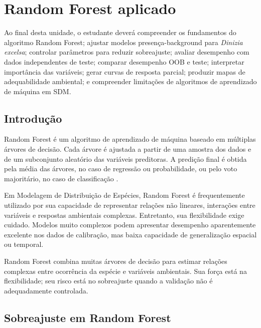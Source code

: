\chapter[Random Forest]{Random Forest aplicado}

\begin{objetivos}
	Ao final desta unidade, o estudante deverá compreender os fundamentos do algoritmo Random Forest; ajustar modelos presença-background para \textit{Dinizia excelsa}; controlar parâmetros para reduzir sobreajuste; avaliar desempenho com dados independentes de teste; comparar desempenho OOB e teste; interpretar importância das variáveis; gerar curvas de resposta parcial; produzir mapas de adequabilidade ambiental; e compreender limitações de algoritmos de aprendizado de máquina em SDM.
\end{objetivos}

\section{Introdução}

Random Forest é um algoritmo de aprendizado de máquina baseado em múltiplas árvores de decisão. Cada árvore é ajustada a partir de uma amostra dos dados e de um subconjunto aleatório das variáveis preditoras. A predição final é obtida pela média das árvores, no caso de regressão ou probabilidade, ou pelo voto majoritário, no caso de classificação \parencite{breiman2001random,cutler2007random,guisan2017habitat}.

Em Modelagem de Distribuição de Espécies, Random Forest é frequentemente utilizado por sua capacidade de representar relações não lineares, interações entre variáveis e respostas ambientais complexas. Entretanto, sua flexibilidade exige cuidado. Modelos muito complexos podem apresentar desempenho aparentemente excelente nos dados de calibração, mas baixa capacidade de generalização espacial ou temporal.

\begin{conceito}[title={\faBook\quad Random Forest em SDM}]
	Random Forest combina muitas árvores de decisão para estimar relações complexas entre ocorrência da espécie e variáveis ambientais. Sua força está na flexibilidade; seu risco está no sobreajuste quando a validação não é adequadamente controlada.
\end{conceito}

\section{Sobreajuste em Random Forest}

